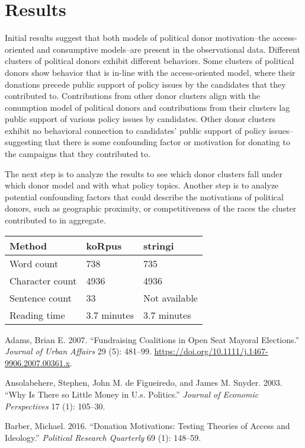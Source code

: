 \documentclass[12pt,]{article}
\begin{document}
\hypertarget{results}{%
\section{Results}\label{results}}

Initial results suggest that both models of political donor
motivation--the access-oriented and consumptive models--are present in
the observational data. Different clusters of political donors exhibit
different behaviors. Some clusters of political donors show behavior
that is in-line with the access-oriented model, where their donations
precede public support of policy issues by the candidates that they
contributed to. Contributions from other donor clusters align with the
conumption model of political donors and contributions from their
clusters lag public support of various policy issues by candidates.
Other donor clusters exhibit no behavioral connection to candidates'
public support of policy issues--suggesting that there is some
confounding factor or motivation for donating to the campaigns that they
contributed to.

The next step is to analyze the results to see which donor clusters fall
under which donor model and with what policy topics. Another step is to
analyze potential confounding factors that could describe the
motivations of political donors, such as geographic proximity, or
competitiveness of the races the cluster contributed to in aggregate.

\begin{longtable}[]{@{}lll@{}}
\toprule
Method & koRpus & stringi\tabularnewline
\midrule
\endhead
Word count & 738 & 735\tabularnewline
Character count & 4936 & 4936\tabularnewline
Sentence count & 33 & Not available\tabularnewline
Reading time & 3.7 minutes & 3.7 minutes\tabularnewline
\bottomrule
\end{longtable}

\hypertarget{refs}{}
\leavevmode\hypertarget{ref-adams2016}{}%
Adams, Brian E. 2007. ``Fundraising Coalitions in Open Seat Mayoral
Elections.'' \emph{Journal of Urban Affairs} 29 (5): 481--99.
\url{https://doi.org/10.1111/j.1467-9906.2007.00361.x}.

\leavevmode\hypertarget{ref-ansolabehere2003}{}%
Ansolabehere, Stephen, John M. de Figueiredo, and James M. Snyder. 2003.
``Why Is There so Little Money in U.s. Politics.'' \emph{Journal of
Economic Perspectives} 17 (1): 105--30.

\leavevmode\hypertarget{ref-barber2016}{}%
Barber, Michael. 2016. ``Donation Motivations: Testing Theories of
Access and Ideology.'' \emph{Political Research Quarterly} 69 (1):
148--59.
\end{document}
